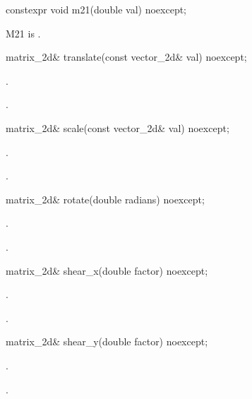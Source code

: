 %
\begin{itemdecl}
constexpr void m21(double val) noexcept;
\end{itemdecl}
\begin{itemdescr}
\pnum
\effects
M21 is .
\end{itemdescr}

%
\begin{itemdecl}
matrix_2d& translate(const vector_2d& val) noexcept;
\end{itemdecl}
\begin{itemdescr}
\pnum
\effects
{}.

\pnum
\returns
{}.
\end{itemdescr}

%
\begin{itemdecl}
matrix_2d& scale(const vector_2d& val) noexcept;
\end{itemdecl}
\begin{itemdescr}
\pnum
\effects
{}.

\pnum
\returns
{}.
\end{itemdescr}

%
\begin{itemdecl}
matrix_2d& rotate(double radians) noexcept;
\end{itemdecl}
\begin{itemdescr}
\pnum
\effects
{}.

\pnum
\returns
{}.
\end{itemdescr}

%
\begin{itemdecl}
matrix_2d& shear_x(double factor) noexcept;
\end{itemdecl}
\begin{itemdescr}
\pnum
\effects
{}.

\pnum
\returns
{}.
\end{itemdescr}

%
\begin{itemdecl}
matrix_2d& shear_y(double factor) noexcept;
\end{itemdecl}
\begin{itemdescr}
\pnum
\effects
{}.

\pnum
\returns
{}.
\end{itemdescr}

